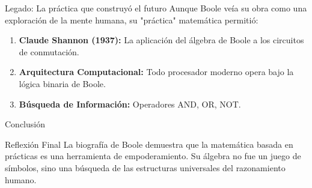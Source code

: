 \documentclass{beamer}
\begin{document}
\begin{frame}{Legado: La práctica que construyó el futuro}
    Aunque Boole veía su obra como una exploración de la mente humana, su "práctica" matemática permitió:
    \begin{enumerate}
        \item \textbf{Claude Shannon (1937):} La aplicación del álgebra de Boole a los circuitos de conmutación.
        \item \textbf{Arquitectura Computacional:} Todo procesador moderno opera bajo la lógica binaria de Boole.
        \item \textbf{Búsqueda de Información:} Operadores AND, OR, NOT.
    \end{enumerate}
\end{frame}

\begin{frame}{Conclusión}
    \begin{alertblock}{Reflexión Final}
        La biografía de Boole demuestra que la matemática basada en prácticas es una herramienta de empoderamiento. Su álgebra no fue un juego de símbolos, sino una búsqueda de las estructuras universales del razonamiento humano.
    \end{alertblock}
\end{frame}
\end{document}
